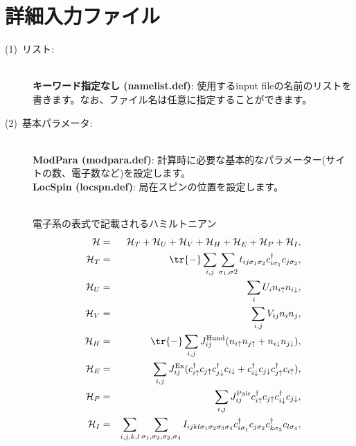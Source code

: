 \newpage
\section{詳細入力ファイル}
\label{Ch:HowToExpert}

\begin{description}
\item[(1)~リスト:]
~\\{\bf キーワード指定なし (namelist.def)}:
使用するinput fileの名前のリストを書きます。なお、ファイル名は任意に指定することができます。
\item[(2)~基本パラメータ:]
~\\{\bf ModPara (modpara.def)}: 計算時に必要な基本的なパラメーター(サイトの数、電子数など)を設定します。
~\\{\bf LocSpin (locspn.def)}: 局在スピンの位置を設定します。
\item[] 
~\\電子系の表式で記載されるハミルトニアン
\begin{eqnarray}
{\cal H}&=&{\cal H}_T+{\cal H}_U+{\cal H}_V+{\cal H}_H+{\cal H}_E+{\cal H}_P+{\cal H}_I,\\
{\cal H}_T&=&\tr{-}\sum_{i, j}\sum_{\sigma_1, \sigma2}t_{ij\sigma_1\sigma_2} c_{i\sigma_1}^{\dag}c_{j\sigma_2},\\
{\cal H}_U&=&\sum_{i} U_i n_ {i \uparrow}n_{i \downarrow},\\
{\cal H}_V&=&\sum_{i,j} V_{ij}n_ {i}n_{j},\\
{\cal H}_H&=&\tr{-}\sum_{i,j}J_{ij}^{\rm Hund} (n_{i\uparrow}n_{j\uparrow}+n_{i\downarrow}n_{j\downarrow}),\\
{\cal H}_E&=&\sum_{i,j}J_{ij}^{\rm Ex} (c_ {i \uparrow}^{\dag}c_{j\uparrow}c_{j \downarrow}^{\dag}c_{i  \downarrow}+c_ {i \downarrow}^{\dag}c_{j\downarrow}c_{j \uparrow}^{\dag}c_{i  \uparrow}),\\
{\cal H}_P&=&\sum_{i,j}J_{ij}^{\rm Pair} c_ {i \uparrow}^{\dag}c_{j\uparrow}c_{i \downarrow}^{\dag}c_{j  \downarrow},\\
{\cal H}_I&=&\sum_{i,j,k,l}\sum_{\sigma_1,\sigma_2, \sigma_3, \sigma_4}
I_{ijkl\sigma_1\sigma_2\sigma_3\sigma_4}c_{i\sigma_1}^{\dagger}c_{j\sigma_2}c_{k\sigma_3}^{\dagger}c_{l\sigma_4}, 

\end{eqnarray}
\end{description}
